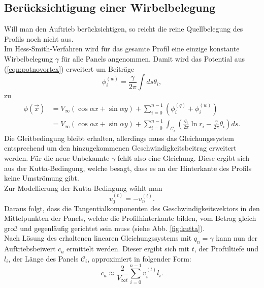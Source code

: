 \subsection{Berücksichtigung einer Wirbelbelegung}
Will man den Auftrieb berücksichtigen, so reicht die reine Quellbelegung des Profils noch nicht aus. \\
Im Hess-Smith-Verfahren wird für das gesamte Profil eine einzige konstante Wirbelbelegung $\gamma$ für alle Panels angenommen. Damit wird das Potential aus (\ref{eqn:potnovortex}) erweitert um Beiträge
\begin{equation}
\phi_i^{(w)} =  \frac{\gamma}{2 \pi } \int ds \theta_i,
\end{equation}
zu
\begin{align}
\phi(\vec x) &=  V_{\infty} (\cos \alpha x + \sin \alpha y) + \sum_{i=0}^{n-1} \left( \phi_i^{(q)} + \phi_i^{(w)} \right) \nonumber \\
&= V_{\infty} (\cos \alpha x + \sin \alpha y) + \sum_{i=0}^{n-1} \int_{\mathcal{C}_i} \left( \frac{q_i}{2\pi } \ln r_i - \frac{\gamma}{2\pi } \theta_{i} \right) ds.
\end{align}
Die Gleitbedingung bleibt erhalten, allerdings muss das Gleichungssystem entsprechend um den hinzugekommenen Geschwindigkeitsbeitrag erweitert werden. Für die neue Unbekannte $\gamma$ fehlt also eine Gleichung. Diese ergibt sich aus der Kutta-Bedingung, welche besagt, dass es an der Hinterkante des Profils keine Umströmung gibt.\\
Zur Modellierung der Kutta-Bedingung wählt man
\begin{equation}
v_0^{(t)} =  -v_n^{(t)}.
\end{equation} 
Daraus folgt, dass die Tangentialkomponenten des Geschwindigkeitsvektors in den Mittelpunkten der Panels, welche die Profilhinterkante bilden, vom Betrag gleich groß und gegenläufig gerichtet sein muss (siehe Abb. \ref{fig:kutta}). \\
Nach Lösung des erhaltenen linearen Gleichungssystems mit $q_n = \gamma$ kann nun der Auftriebsbeiwert $c_a$ ermittelt werden. Dieser ergibt sich mit $t$, der Proftiltiefe und $l_i$, der Länge des Panels $\mathcal{C}_i$, approximiert in folgender Form:
\begin{equation}
c_a \approx \frac{2}{V_{\infty t}}\sum_{i=0}^{n-1} v_i^{(t)} l_i.
\end{equation}
